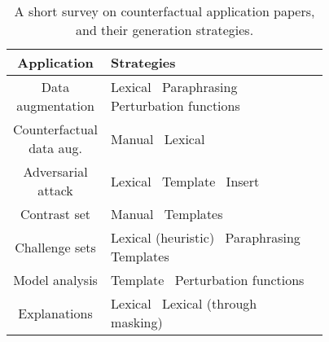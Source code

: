 \begin{table*}[t]
\small
\centering
\setlength{\tabcolsep}{3.5pt}
\begin{tabular}{c p{0.77\linewidth}}
\toprule
\textbf{Application} & \textbf{Strategies} \\ 
\midrule
Data augmentation & 
    Lexical~\cite{Wu2019ConditionalBC, Wei2019EDAED, Kumar2020DataAU}\newline
    Paraphrasing~\cite{iyyer2018adversarial} \newline
    Perturbation functions~\cite{ratner2017snorkel}
\\\midrule
Counterfactual data aug. & 
    Manual~\cite{kaushik2019learning}
    Lexical~\cite{garg2019counterfactual}
\\\midrule
Adversarial attack & 
    Lexical~\cite{alzantot2018generating, garg2020bae, li-etal-2020-bert-attack, morris2020textattack, tan2020s, jin2020bert, ebrahimi2017hotflip, Zhang2019GeneratingFA, Jia2019CertifiedRT} \newline
    Template~\cite{jiang2019avoiding}\newline
    Insert~\cite{Song2020UniversalAA}
\\\midrule
Contrast set & 
    Manual~\cite{gardner2020contrast} \newline
    Templates~\cite{li2020linguistically}
\\\midrule
Challenge sets  & 
    Lexical (heuristic)~\cite{kaushik2019learning, naik2018stress} \newline
    Paraphrasing~\cite{Kavumba2019WhenCP} \newline
    Templates~\cite{Geiger2019PosingFG, kaushik2019learning, nie2019analyzing, mccoy2019right}
\\\midrule
Model analysis & 
    Template~\cite{Goodwin2020ProbingLS}\newline
    Perturbation functions~\cite{wu2019errudite, bowman-etal-2015-large, checklist:acl20}
\\\midrule
Explanations & 
    Lexical~\cite{hase2020evaluating, vig2020causal, kang2020counterfactual} \newline
    Lexical (through masking)~\cite{ramon2019counterfactual, ribeiro2018anchors}
\\
\bottomrule
\end{tabular}
\vspace{-5pt}

\caption{A short survey on counterfactual application papers, and their generation strategies.}
\label{table:perturb_application}
\vspace{-10pt}

\end{table*}

